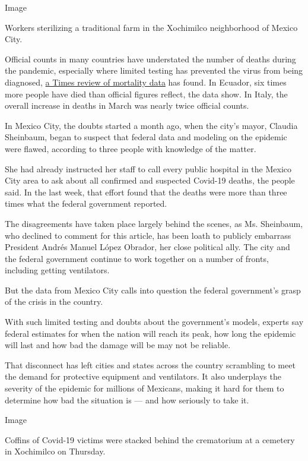 Image

Workers sterilizing a traditional farm in the Xochimilco neighborhood of
Mexico City.

Official counts in many countries have understated the number of deaths
during the pandemic, especially where limited testing has prevented the
virus from being diagnosed,
\href{https://www.nytimes.com/interactive/2020/04/21/world/coronavirus-missing-deaths.html}{a
Times review of mortality data} has found. In Ecuador, six times more
people have died than official figures reflect, the data show. In Italy,
the overall increase in deaths in March was nearly twice official
counts.

In Mexico City, the doubts started a month ago, when the city's mayor,
Claudia Sheinbaum, began to suspect that federal data and modeling on
the epidemic were flawed, according to three people with knowledge of
the matter.

She had already instructed her staff to call every public hospital in
the Mexico City area to ask about all confirmed and suspected Covid-19
deaths, the people said. In the last week, that effort found that the
deaths were more than three times what the federal government reported.

The disagreements have taken place largely behind the scenes, as Ms.
Sheinbaum, who declined to comment for this article, has been loath to
publicly embarrass President Andrés Manuel López Obrador, her close
political ally. The city and the federal government continue to work
together on a number of fronts, including getting ventilators.

But the data from Mexico City calls into question the federal
government's grasp of the crisis in the country.

With such limited testing and doubts about the government's models,
experts say federal estimates for when the nation will reach its peak,
how long the epidemic will last and how bad the damage will be may not
be reliable.

That disconnect has left cities and states across the country scrambling
to meet the demand for protective equipment and ventilators. It also
underplays the severity of the epidemic for millions of Mexicans, making
it hard for them to determine how bad the situation is --- and how
seriously to take it.

Image

Coffins of Covid-19 victims were stacked behind the crematorium at a
cemetery in Xochimilco on Thursday.

